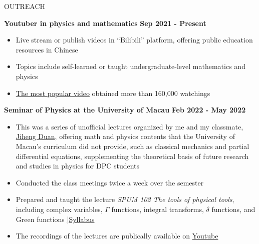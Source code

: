 \documentclass[11pt]{article}
\begin{document}
\begin{section}{OUTREACH}

\textbf{Youtuber in physics and mathematics} \hfill \textbf{Sep 2021 - Present}
\begin{itemize}[leftmargin=1.5em]
    \item Live stream or publish videos in ``Bilibili'' platform, offering public education resources in Chinese
    \item Topics include self-learned or taught undergraduate-level mathematics and physics
    \item \href{https://www.bilibili.com/video/BV1th411W7xu/}{The most popular video} obtained more than 160,000 watchings
\end{itemize}

\textbf{Seminar of Physics at the University of Macau} \hfill \textbf{Feb 2022 - May 2022}
\begin{itemize}[leftmargin=1.5em]
    \item This was a series of unofficial lectures organized by me and my classmate, \href{http://runawayfancy.me/}{Jiheng Duan}, offering math and physics contents that the University of Macau's curriculum did not provide, such as classical mechanics and partial differential equations, supplementing the theoretical basis of future research and studies in physics for DPC students 
    \item Conducted the class meetings twice a week over the semester
    \item Prepared and taught the lecture \textit{SPUM 102 The tools of physical tools}, including complex variables, $\Gamma$ functions, integral transforms, $\delta$ functions, and Green functions \hfill {\footnotesize \href{https://github.com/Chisen-Lupus/Seminar-of-Physics-UM/blob/main/SPUM%20102%20The%20tools%20of%20physical%20tool.pdf}{|Syllabus}}
    \item The recordings of the lectures are publically available on \href{https://www.youtube.com/watch?v=nQkv03r-XeQ&list=PLV9fHDZW7hHWQ9rrAk7c9kdeV-Lqyt7pV&index=10}{Youtube}
\end{itemize}

\end{section}

\newpage
    
\end{document}
